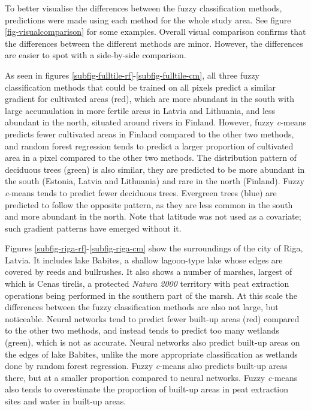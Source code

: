 \documentclass[a4paper,10pt]{book}
\begin{document}
To better visualise the differences between the fuzzy classification methods, predictions were made using each method for the whole study area. See figure \ref{fig-visualcomparison} for some examples. Overall visual comparison confirms that the differences between the different methods are minor. However, the differences are easier to spot with a side-by-side comparison.

As seen in figures \ref{subfig-fulltile-rf}-\ref{subfig-fulltile-cm}, all three fuzzy classification methods that could be trained on all pixels predict a similar gradient for cultivated areas (red), which are more abundant in the south with large accumulation in more fertile areas in Latvia and Lithuania, and less abundant in the north, situated around rivers in Finland. However, fuzzy \textit{c}-means predicts fewer cultivated areas in Finland compared to the other two methods, and random forest regression tends to predict a larger proportion of cultivated area in a pixel compared to the other two methods. The distribution pattern of deciduous trees (green) is also similar, they are predicted to be more abundant in the south (Estonia, Latvia and Lithuania) and rare in the north (Finland). Fuzzy \textit{c}-means tends to predict fewer deciduous trees. Evergreen trees (blue) are predicted to follow the opposite pattern, as they are less common in the south and more abundant in the north. Note that latitude was not used as a covariate; such gradient patterns have emerged without it.

Figures \ref{subfig-riga-rf}-\ref{subfig-riga-cm} show the surroundings of the city of Riga, Latvia. It includes lake Babites, a shallow lagoon-type lake whose edges are covered by reeds and bullrushes. It also shows a number of marshes, largest of which is Cenas tirelis, a protected \textit{Natura 2000} territory with peat extraction operations being performed in the southern part of the marsh. At this scale the differences between the fuzzy classification methods are also not large, but noticeable. Neural networks tend to predict fewer built-up areas (red) compared to the other two methods, and instead tends to predict too many wetlands (green), which is not as accurate. Neural networks also predict built-up areas on the edges of lake Babites, unlike the more appropriate classification as wetlands done by random forest regression. Fuzzy \textit{c}-means also predicts built-up areas there, but at a smaller proportion compared to neural networks. Fuzzy \textit{c}-means also tends to overestimate the proportion of built-up areas in peat extraction sites and water in built-up areas.
\end{document}
